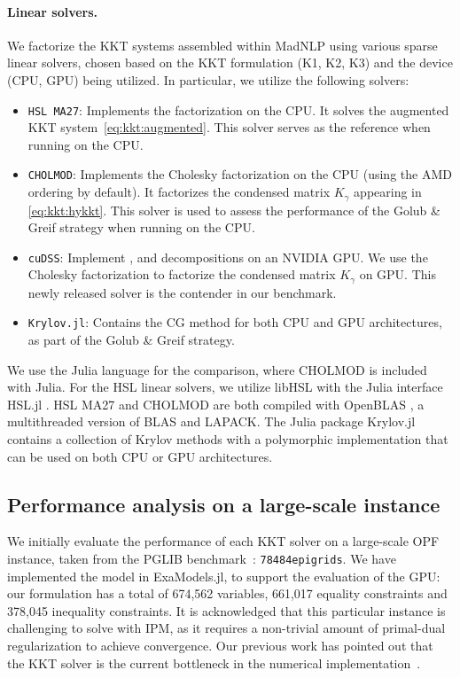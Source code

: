\paragraph{Linear solvers.}
We factorize the KKT systems assembled within MadNLP using various sparse linear solvers, chosen based on the KKT formulation (K1, K2, K3) and the device (CPU, GPU) being utilized.
In particular, we utilize the following solvers:
\begin{itemize}
  \item {\tt HSL MA27}: Implements the \lblt factorization on the CPU.
    It solves the augmented KKT system~\eqref{eq:kkt:augmented}.
    This solver serves as the reference when running on the CPU.
  \item {\tt CHOLMOD}: Implements the Cholesky factorization on the CPU
    (using the AMD ordering \cite{amestoy-david-duff-2004} by default).
    It factorizes the condensed matrix $K_\gamma$ appearing in \eqref{eq:kkt:hykkt}.
    This solver is used to assess the performance of the Golub \& Greif strategy when running on the CPU.
  \item {\tt cuDSS}: Implement \llt, \ldlt and \lu decompositions on an NVIDIA GPU.
    We use the Cholesky factorization to factorize the condensed matrix $K_\gamma$ on GPU.
    This newly released solver is the contender in our benchmark.
  \item {\tt Krylov.jl}: Contains the CG method for both CPU and GPU architectures, as part of the Golub \& Greif strategy.
\end{itemize}

We use the Julia language \cite{bezanson-edelman-karpinski-shah-2017} for the comparison, where CHOLMOD \cite{chen-davis-hager-rajamanickam-2008} is included with Julia.
For the HSL linear solvers, we utilize libHSL \cite{fowkes-lister-montoison-orban-2024} with the Julia interface HSL.jl \cite{montoison-orban-hsl-2021}.
HSL MA27 and CHOLMOD are both compiled with OpenBLAS \cite{openblas}, a multithreaded version of BLAS and LAPACK.
The Julia package Krylov.jl~\cite{montoison2023krylov} contains a collection of Krylov methods with a polymorphic implementation that can be used on both CPU or GPU architectures.

\subsection{Performance analysis on a large-scale instance}
We initially evaluate the performance of each KKT solver on a large-scale OPF instance, taken from
the PGLIB benchmark~\cite{babaeinejadsarookolaee2019power}: {\tt 78484epigrids}.
We have implemented the model in ExaModels.jl, to support
the evaluation of the GPU: our formulation has
a total of 674,562 variables, 661,017 equality constraints and 378,045
inequality constraints.
It is acknowledged that this particular instance is challenging to solve
with IPM, as it requires a non-trivial amount of primal-dual regularization
to achieve convergence.
Our previous work has pointed out that the KKT solver is the current bottleneck
in the numerical implementation~\cite{shin2023accelerating}.

